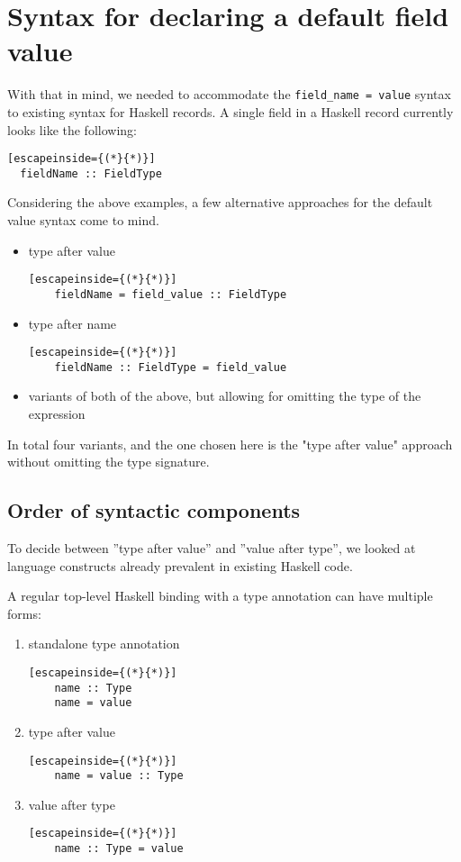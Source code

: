 \documentclass[en]{pracamgr}
\begin{document}
\section{Syntax for declaring a default field value}
With that in mind, we needed to accommodate the \texttt{field\_name = value} syntax to existing syntax for Haskell records.
A single field in a Haskell record currently looks like the following:
\begin{lstlisting}[escapeinside={(*}{*)}]
  fieldName :: FieldType
\end{lstlisting}
Considering the above examples, a few alternative approaches for the default value syntax come to mind.

\begin{itemize}
  \item type after value
  \begin{lstlisting}[escapeinside={(*}{*)}]
    fieldName = field_value :: FieldType
  \end{lstlisting}
  \item type after name
  \begin{lstlisting}[escapeinside={(*}{*)}]
    fieldName :: FieldType = field_value
  \end{lstlisting}
  \item variants of both of the above, but allowing for omitting the type of the expression
\end{itemize}

In total four variants, and the one chosen here is the "type after value" approach without omitting the type signature.
\subsection{Order of syntactic components}
To decide between ''type after value'' and ''value after type'', we looked at language constructs already prevalent in existing Haskell code.

A regular top-level Haskell binding with a type annotation can have multiple forms:
\begin{enumerate}
  \item \label{vb:popular} standalone type annotation
  \begin{lstlisting}[escapeinside={(*}{*)}]
    name :: Type 
    name = value
  \end{lstlisting}
  \item \label{vb:good} type after value
  \begin{lstlisting}[escapeinside={(*}{*)}]
    name = value :: Type
  \end{lstlisting}  
  \item \label{vb:bad} value after type
  \begin{lstlisting}[escapeinside={(*}{*)}]
    name :: Type = value
  \end{lstlisting}
\end{enumerate}
\end{document}
